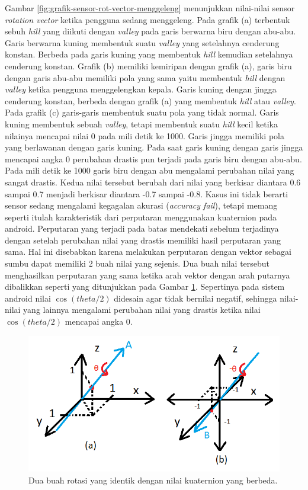 Gambar \ref{fig:grafik-sensor-rot-vector-menggeleng} menunjukkan nilai-nilai sensor \textit{rotation vector} ketika pengguna sedang menggeleng. Pada grafik (a) terbentuk sebuh \textit{hill} yang diikuti dengan \textit{valley} pada garis berwarna biru dengan abu-abu. Garis berwarna kuning membentuk suatu \textit{valley} yang setelahnya cenderung konstan. Berbeda pada garis kuning yang membentuk \textit{hill} kemudian setelahnya cenderung konstan. Grafik (b) memiliki kemiripan dengan grafik (a), garis biru dengan garis abu-abu memiliki pola yang sama yaitu membentuk \textit{hill} dengan \textit{valley} ketika pengguna menggelengkan kepala. Garis kuning dengan jingga cenderung konstan, berbeda dengan grafik (a) yang membentuk \textit{hill} atau \textit{valley}. Pada grafik (c) garis-garis membentuk suatu pola yang tidak normal. Garis kuning membentuk sebuah \textit{valley}, tetapi membentuk suatu \textit{hill} kecil ketika nilainya mencapai nilai 0 pada mili detik ke 1000. Garis jingga memiliki pola yang berlawanan dengan garis kuning. Pada saat garis kuning dengan garis jingga mencapai angka 0 perubahan drastis pun terjadi pada garis biru dengan abu-abu. Pada mili detik ke 1000 garis biru dengan abu mengalami perubahan nilai yang sangat drastis. Kedua nilai tersebut berubah dari nilai yang berkisar diantara 0.6 sampai 0.7 menjadi berkisar diantara -0.7 sampai -0.8. Kasus ini tidak berarti sensor sedang mengalami kegagalan akurasi (\textit{accuracy fail}), tetapi memang seperti itulah karakteristik dari perputaran menggunakan kuaternion pada android. Perputaran yang terjadi pada batas mendekati sebelum terjadinya dengan setelah perubahan nilai yang drastis memiliki hasil perputaran yang sama. Hal ini disebabkan karena melakukan perputaran dengan vektor sebagai sumbu dapat memiliki 2 buah nilai yang sejenis. Dua buah nilai tersebut menghasilkan perputaran yang sama ketika arah vektor dengan arah putarnya dibalikkan seperti yang ditunjukkan pada Gambar \ref{fig:penjelasan-perputaran-quaternion-android-sensor}. Sepertinya pada sistem android nilai $\cos (theta/2)$ didesain agar tidak bernilai negatif, sehingga nilai-nilai yang lainnya mengalami perubahan nilai yang drastis ketika nilai $\cos (theta/2)$ mencapai angka 0.


\begin{figure}[htbp]
\centering
\includegraphics[scale=0.6]{Gambar/penjelasan-perputaran-quaternion-android-sensor.png}
\caption{Dua buah rotasi yang identik dengan nilai kuaternion yang berbeda.} 
\label{fig:penjelasan-perputaran-quaternion-android-sensor}
\end{figure}

